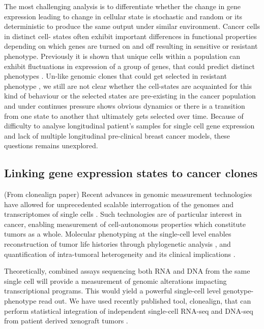 The most challenging analysis is to differentiate whether the change in gene expression leading to change in cellular state is stochastic \cite{raj2008nature} and random or its deterministic to produce the same output under similar environment.
Cancer cells in distinct cell- states often exhibit important differences in functional properties depending on which genes are turned on and off resulting in sensitive  or resistant phenotype.
Previously it is shown that unique cells within a population can exhibit fluctuations in expression of a group of genes, that could predict distinct phenotypes \cite{shaffer2020memory}.
Un-like genomic clones that could get selected in resistant phenotype \cite{salehi2020single}, we still are not clear whether the cell-states are acquainted for this kind of behaviour or the selected states are pre-existing in the cancer population and under continues pressure shows obvious dynamics or there is a transition from one state to another that ultimately gets selected over time. Because of difficulty to analyse longitudinal patient's samples for single cell gene expression and lack of multiple longitudinal pre-clinical breast cancer models, these questions remains unexplored.

\subsection{Linking gene expression states to cancer clones}
(From clonealign paper) Recent advances in genomic measurement technologies have allowed for unprecedented scalable interrogation of the genomes and transcriptomes of single cells \cite{zahn2017scalable, zheng2017massively}. Such technologies are of particular interest in cancer, enabling measurement of cell-autonomous properties which constitute tumors as a whole. Molecular phenotyping at the single-cell level enables reconstruction of tumor life histories through phylogenetic analysis \cite{jahn2016tree, smith2017scape}, and quantification of intra-tumoral heterogeneity and its clinical implications \cite{tellez2016tumour,mitra2014single}.

Theoretically, combined assays sequencing both RNA and DNA from the same single cell will provide a measurement of genomic alterations impacting transcriptional programs. This would yield a powerful single-cell level genotype-phenotype read out. We have used recently published tool, clonealign, that can perform statistical integration of independent single-cell RNA-seq and DNA-seq from patient derived xenograft tumors \cite{campbell2019clonealign}.  


